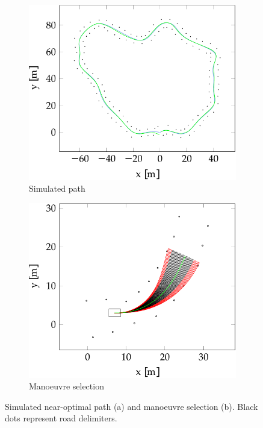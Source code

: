 \begin{figure}[H]
	\centering
	\begin{subfigure}[b]{0.45\textwidth}
		\includegraphics[width=\textwidth]{pathloop}
		\caption{Simulated path}
		\label{fig:6:loop}   
	\end{subfigure} 
	\hspace{1em}         
	\begin{subfigure}[b]{0.45\textwidth}
		\includegraphics[width=\textwidth]{manoeuvre}
		\caption{Manoeuvre selection}
		\label{fig:6:mano}
	\end{subfigure}             
	\caption[Simulated near-optimal path and manoeuvre selection]{Simulated near-optimal path (a) and manoeuvre selection (b). Black dots represent road delimiters.}
	\label{fig:6:loopmano}
\end{figure}

